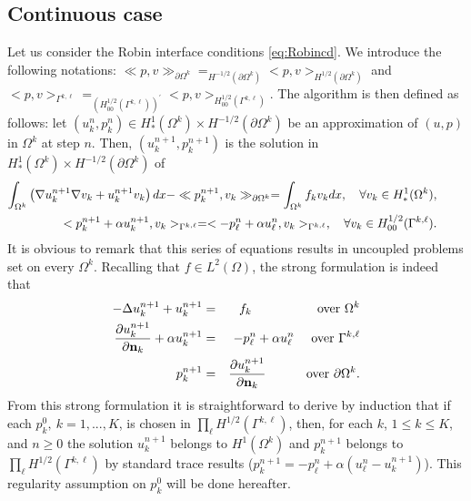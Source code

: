 \documentclass[final]{siamltex}
\begin{document}
\subsection{Continuous case}
Let us consider the Robin interface conditions \eqref{eq:Robincd}.
We introduce the following notations: $\ll p,v \gg_{\partial\Omega^k}= _{H^{-1/2}(\partial\Omega^k)}<p,v>_{H^{1/2}(\partial\Omega^k)}$
and $<p,v>_{\Gamma^{k,\ell}}=_{(H_{00}^{1/2}(\Gamma^{k,\ell}))^{\prime}}<p,v>_{H_{00}^{1/2}(\Gamma^{k,\ell})}$.
The algorithm is then defined as follows: let $(u_k^n,p_k^n) \in
H^1_*(\Omega^k) \times H^{-1/2}(\partial\Omega^k)$
be an approximation of $(u,p)$ in $\Omega^k$ at step $n$.
Then, $(u_k^{n+1},p_k^{n+1})$ is the solution in
$H^1_*(\Omega^k) \times H^{-1/2}(\partial\Omega^k)$ of
\begin{eqnarray}
\label{algo_continu}
\int_{\Omega^k} \left( \nabla u_k^{n+1}\nabla v_k
+u_k^{n+1}v_k \right) dx
- \ll p_k^{n+1},v_k\gg_{\partial\Omega^k}
= \int_{\Omega^k} f_kv_kdx, \quad \forall v_k \in H^1_*(\Omega^k),  \hspace{8mm}\\
\label{CI_continu}
<p_k^{n+1}+ \alpha u_k^{n+1},v_k>_{\Gamma^{k,\ell}}=
<- p_{\ell}^{n} + \alpha u_{\ell}^{n},v_k>_{\Gamma^{k,\ell}},
\quad \forall v_k \in H_{00}^{1/2}(\Gamma^{k,\ell}). \hspace{8mm}
\end{eqnarray}
It is obvious to remark that this series of equations results in uncoupled
problems
set on every $\Omega^k$. Recalling that $f\in L^2(\Omega)$, the strong
formulation is indeed that
\begin{eqnarray}
-\Delta u_k^{n+1} + u_k^{n+1} &=& f_k \hspace{1.7cm}\hbox{ over }\Omega^k \nonumber\\
{\displaystyle}{\partial u_k^{n+1}\over\partial {{\bf n}}_k} + \alpha u_k^{n+1} &=& -p_\ell^n+\alpha
u_\ell^n \quad\hbox{ over } \Gamma^{k,\ell} \nonumber\\
\label{flux_fort}
{\displaystyle} p_k^{n+1} &=& {\partial u_k^{n+1}\over\partial {{\bf n}}_k} \hspace{1cm}\hbox{ over }
\partial\Omega^k.
\end{eqnarray}
From this strong formulation it is
straightforward to derive by induction that if each
$p^0_k, \ k=1,...,K$, is chosen in $\prod_\ell H^{1/2}(\Gamma^{k,\ell})$,
then,
for each $k$, $1\le k\le K$, and $n\ge 0$ the solution
$u_k^{n+1}$ belongs to
$H^1(\Omega^k)$ and $p_k^{n+1}$
belongs to $\prod_\ell
H^{1/2}(\Gamma^{k,\ell})$ by standard trace results ($p_k^{n+1} = -p_\ell^n+\alpha(u^n_\ell-u_k^{n+1})$). This regularity
assumption on $p^0_k$ will be done hereafter.
\end{document}
